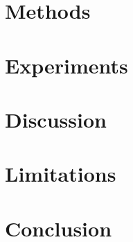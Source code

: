 \documentclass[10pt,letterpaper]{article}
\begin{document}
\section{Methods}


\section{Experiments}


\section{Discussion}


\section{Limitations}


\section{Conclusion}

\end{document}
